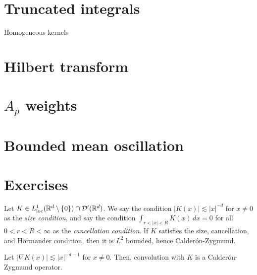 \documentclass{../../large}
\begin{document}
\begin{prb}
\end{prb}


\section{Truncated integrals}

Homogeneous kernels



\section{Hilbert transform}

\begin{prb}
\end{prb}
\begin{prb}
\end{prb}
\begin{prb}
\end{prb}






\section{$A_p$ weights}

\section{Bounded mean oscillation}


\section*{Exercises}
\begin{prb}
Let $K\in L_{\mathrm{loc}}^1(\mathbb{R}^d\setminus\{0\})\cap\mathcal{D}'(\mathbb{R}^d)$.
We say the condition $|K(x)|\lesssim|x|^{-d}$ for $x\ne0$ as the \emph{size condition}, and say the condition $\int_{r<|x|<R}K(x)\,dx=0$ for all $0<r<R<\infty$ as the \emph{cancellation condition}.
If $K$ satisfies the size, cancellation, and H\"ormander condition, then it is $L^2$ bounded, hence Calder\'on-Zygmund.
\end{prb}

\begin{prb}
Let $|\nabla K(x)|\lesssim|x|^{-d-1}$ for $x\ne0$.
Then, convolution with $K$ is a Calder\'on-Zygmund operator.
\end{prb}
\end{document}
